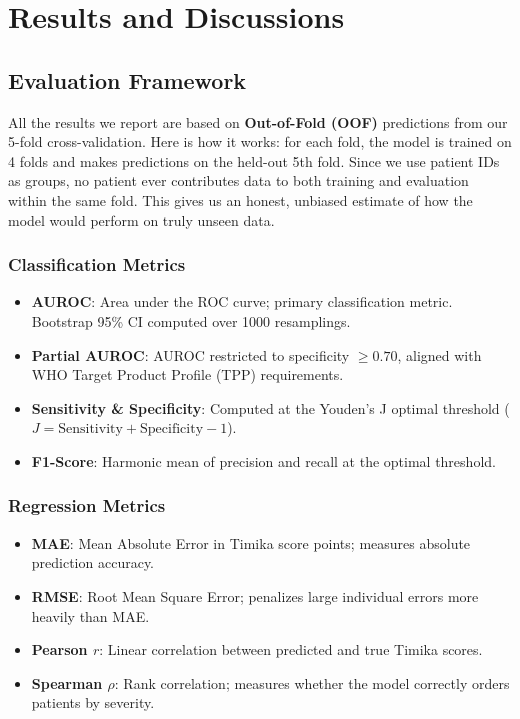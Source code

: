 \documentclass[12pt]{report}
\begin{document}
\chapter{Results and Discussions}
\doublespacing

\section{Evaluation Framework}

All the results we report are based on \textbf{Out-of-Fold (OOF)} predictions from our 5-fold cross-validation. Here is how it works: for each fold, the model is trained on 4 folds and makes predictions on the held-out 5th fold. Since we use patient IDs as groups, no patient ever contributes data to both training and evaluation within the same fold. This gives us an honest, unbiased estimate of how the model would perform on truly unseen data.

\subsection{Classification Metrics}
\begin{itemize}
    \item \textbf{AUROC}: Area under the ROC curve; primary classification metric. Bootstrap 95\% CI computed over 1000 resamplings.
    \item \textbf{Partial AUROC}: AUROC restricted to specificity $\geq 0.70$, aligned with WHO Target Product Profile (TPP) requirements.
    \item \textbf{Sensitivity \& Specificity}: Computed at the Youden's J optimal threshold ($J = \text{Sensitivity} + \text{Specificity} - 1$).
    \item \textbf{F1-Score}: Harmonic mean of precision and recall at the optimal threshold.
\end{itemize}

\subsection{Regression Metrics}
\begin{itemize}
    \item \textbf{MAE}: Mean Absolute Error in Timika score points; measures absolute prediction accuracy.
    \item \textbf{RMSE}: Root Mean Square Error; penalizes large individual errors more heavily than MAE.
    \item \textbf{Pearson $r$}: Linear correlation between predicted and true Timika scores.
    \item \textbf{Spearman $\rho$}: Rank correlation; measures whether the model correctly orders patients by severity.
\end{itemize}
\end{document}
